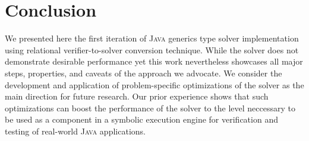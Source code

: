 \section{Conclusion}
\label{sec:conclusion}

We presented here the first iteration of \textsc{Java} generics type solver implementation using relational verifier-to-solver
conversion technique. While the solver does not demonstrate desirable performance yet this work nevertheless showcases all
major steps, properties, and caveats of the approach we advocate. We consider the development and application of problem-specific
optimizations of the solver as the main direction for future research. Our prior experience shows that such optimizations
can boost the performance of the solver to the level neccessary to be used as a component in a symbolic execution engine for verification
and testing of real-world \textsc{Java} applications.
